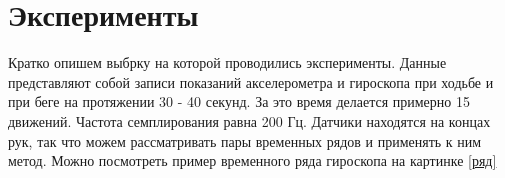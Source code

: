 \documentclass[12pt, twoside]{article}
\begin{document}

\section{Эксперименты}
\label{experiments}
	Кратко опишем выбрку на которой проводились эксперименты. Данные представляют собой записи показаний акселерометра и гироскопа при ходьбе и при беге на протяжении 30 - 40 секунд. За это время делается примерно 15 движений. Частота семплирования равна 200 Гц. Датчики находятся на концах рук, так что можем рассматривать пары временных рядов и применять к ним метод. Можно посмотреть пример временного ряда гироскопа на картинке \ref{ряд}
	
\end{document}
